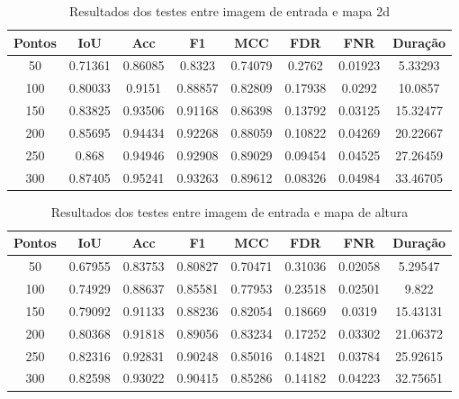 \begin{table}[h]
            \centering
            \caption{Resultados dos testes entre imagem de entrada e mapa 2d}
            \label{tab:final_input_output_2d}
            \begin{tabular}{|c|c|c|c|c|c|c|c|}
                \hline
                                Pontos & IoU & Acc & F1 & MCC & FDR & FNR & Duração \\
                \hline
                50 & 0.71361 & 0.86085 & 0.8323 & 0.74079 & 0.2762 & 0.01923 & 5.33293\\
        100 & 0.80033 & 0.9151 & 0.88857 & 0.82809 & 0.17938 & 0.0292 & 10.0857\\
        150 & 0.83825 & 0.93506 & 0.91168 & 0.86398 & 0.13792 & 0.03125 & 15.32477\\
        200 & 0.85695 & 0.94434 & 0.92268 & 0.88059 & 0.10822 & 0.04269 & 20.22667\\
        250 & 0.868 & 0.94946 & 0.92908 & 0.89029 & 0.09454 & 0.04525 & 27.26459\\
        300 & 0.87405 & 0.95241 & 0.93263 & 0.89612 & 0.08326 & 0.04984 & 33.46705\\
                \hline
            \end{tabular}
        \end{table}


\begin{table}[h]
            \centering
            \caption{Resultados dos testes entre imagem de entrada e mapa de altura}
            \label{tab:final_input_output_3d}
            \begin{tabular}{|c|c|c|c|c|c|c|c|}
                \hline
                                Pontos & IoU & Acc & F1 & MCC & FDR & FNR & Duração \\
                \hline
                50 & 0.67955 & 0.83753 & 0.80827 & 0.70471 & 0.31036 & 0.02058 & 5.29547\\
        100 & 0.74929 & 0.88637 & 0.85581 & 0.77953 & 0.23518 & 0.02501 & 9.822\\
        150 & 0.79092 & 0.91133 & 0.88236 & 0.82054 & 0.18669 & 0.0319 & 15.43131\\
        200 & 0.80368 & 0.91818 & 0.89056 & 0.83234 & 0.17252 & 0.03302 & 21.06372\\
        250 & 0.82316 & 0.92831 & 0.90248 & 0.85016 & 0.14821 & 0.03784 & 25.92615\\
        300 & 0.82598 & 0.93022 & 0.90415 & 0.85286 & 0.14182 & 0.04223 & 32.75651\\
                \hline
            \end{tabular}
        \end{table}


